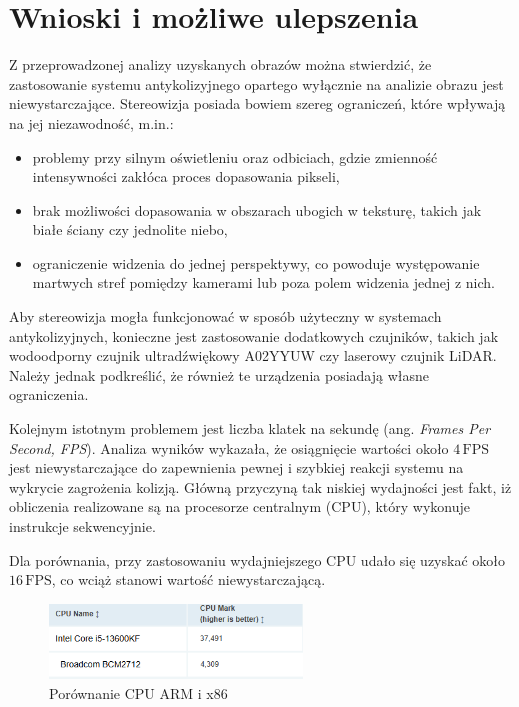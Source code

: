 \documentclass[magisterska]{pracadypl}
\begin{document}
\chapter{Wnioski i możliwe ulepszenia}

Z przeprowadzonej analizy uzyskanych obrazów można stwierdzić, że zastosowanie systemu antykolizyjnego opartego wyłącznie na analizie obrazu jest niewystarczające. 
Stereowizja posiada bowiem szereg ograniczeń, które wpływają na jej niezawodność, m.in.: 

\begin{itemize}
    \item problemy przy silnym oświetleniu oraz odbiciach, gdzie zmienność intensywności zakłóca proces dopasowania pikseli,
    \item brak możliwości dopasowania w obszarach ubogich w teksturę, takich jak białe ściany czy jednolite niebo,
    \item ograniczenie widzenia do jednej perspektywy, co powoduje występowanie martwych stref pomiędzy kamerami lub poza polem widzenia jednej z nich.
\end{itemize}

Aby stereowizja mogła funkcjonować w sposób użyteczny w systemach antykolizyjnych, konieczne jest zastosowanie dodatkowych czujników, takich jak wodoodporny czujnik ultradźwiękowy A02YYUW czy laserowy czujnik LiDAR. Należy jednak podkreślić, że również te urządzenia posiadają własne ograniczenia.

Kolejnym istotnym problemem jest liczba klatek na sekundę (ang. \textit{Frames Per Second, FPS}). Analiza wyników wykazała, że osiągnięcie wartości około $4\,\text{FPS}$ jest niewystarczające do zapewnienia pewnej i szybkiej reakcji systemu na wykrycie zagrożenia kolizją. Główną przyczyną tak niskiej wydajności jest fakt, iż obliczenia realizowane są na procesorze centralnym (CPU), który wykonuje instrukcje sekwencyjnie.

Dla porównania, przy zastosowaniu wydajniejszego CPU udało się uzyskać około $16\,\text{FPS}$, co wciąż stanowi wartość niewystarczającą.

\begin{figure}[H]  %
    \centering  %
    \includegraphics[width=0.6\textwidth]{images/cpu-compare.png}  %
    \captionsetup{font=footnotesize}
    \caption[Porównanie CPU ARM i x86. https://www.cpubenchmark.net/]{Porównanie CPU ARM i x86}
\end{figure}
\end{document}
